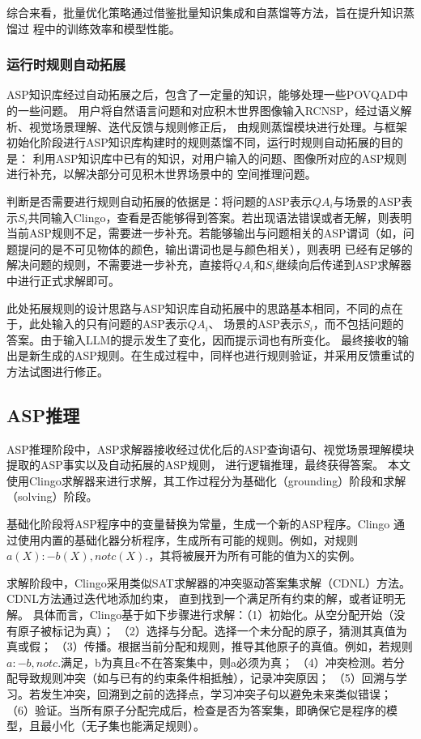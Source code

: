 综合来看，批量优化策略通过借鉴批量知识集成和自蒸馏等方法，旨在提升知识蒸馏过
程中的训练效率和模型性能。
\subsubsection{运行时规则自动拓展}
ASP知识库经过自动拓展之后，包含了一定量的知识，能够处理一些POVQAD中的一些问题。
用户将自然语言问题和对应积木世界图像输入RCNSP，经过语义解析、视觉场景理解、迭代反馈与规则修正后，
由规则蒸馏模块进行处理。与框架初始化阶段进行ASP知识库构建时的规则蒸馏不同，运行时规则自动拓展的目的是：
利用ASP知识库中已有的知识，对用户输入的问题、图像所对应的ASP规则进行补充，以解决部分可见积木世界场景中的
空间推理问题。

判断是否需要进行规则自动拓展的依据是：将问题的ASP表示$QA_i$与场景的ASP表示$S_i$共同输入Clingo，查看是否能够得到答案。若出现语法错误或者无解，则表明
当前ASP规则不足，需要进一步补充。若能够输出与问题相关的ASP谓词（如，问题提问的是不可见物体的颜色，输出谓词也是与颜色相关），则表明
已经有足够的解决问题的规则，不需要进一步补充，直接将$QA_i$和$S_i$继续向后传递到ASP求解器中进行正式求解即可。

此处拓展规则的设计思路与ASP知识库自动拓展中的思路基本相同，不同的点在于，此处输入的只有问题的ASP表示$QA_i$、
场景的ASP表示$S_i$，而不包括问题的答案。由于输入LLM的提示发生了变化，因而提示词也有所变化。
最终接收的输出是新生成的ASP规则。在生成过程中，同样也进行规则验证，并采用反馈重试的方法试图进行修正。
\subsection{ASP推理}
ASP推理阶段中，ASP求解器接收经过优化后的ASP查询语句、视觉场景理解模块提取的ASP事实以及自动拓展的ASP规则，
进行逻辑推理，最终获得答案。
本文使用Clingo求解器来进行求解，其工作过程分为基础化（grounding）阶段和求解（solving）阶段。

基础化阶段将ASP程序中的变量替换为常量，生成一个新的ASP程序。Clingo
通过使用内置的基础化器分析程序，生成所有可能的规则。例如，对规则
$a(X) :- b(X), not c(X).$，其将被展开为所有可能的值为X的实例。

求解阶段中，Clingo采用类似SAT求解器的冲突驱动答案集求解（CDNL）方法。CDNL方法通过迭代地添加约束，
直到找到一个满足所有约束的解，或者证明无解。
具体而言，Clingo基于如下步骤进行求解：（1）初始化。从空分配开始（没有原子被标记为真）；
（2）选择与分配。选择一个未分配的原子，猜测其真值为真或假；
（3）传播。根据当前分配和规则，推导其他原子的真值。例如，若规则$a :- b, not c.$满足，b为真且c不在答案集中，则a必须为真；
（4）冲突检测。若分配导致规则冲突（如与已有的约束条件相抵触），记录冲突原因；
（5）回溯与学习。若发生冲突，回溯到之前的选择点，学习冲突子句以避免未来类似错误；
（6）验证。当所有原子分配完成后，检查是否为答案集，即确保它是程序的模型，且最小化（无子集也能满足规则）。

